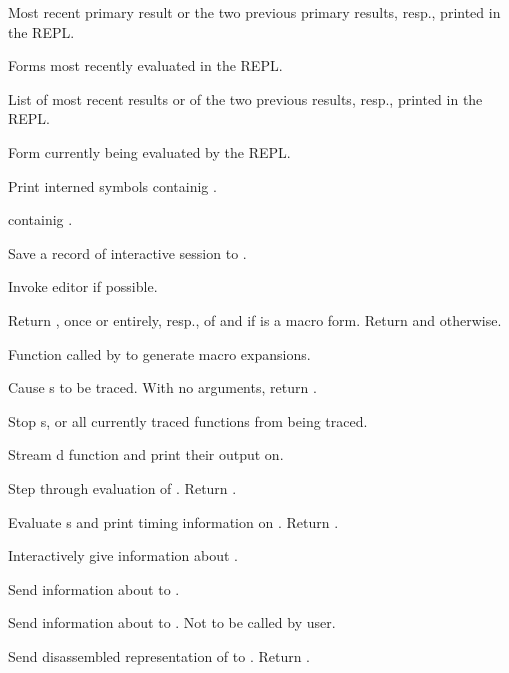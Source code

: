 \begin{LIST}{1cm}
  
  \IT{\Goo{\kwd*{*}\XOR\kwd*{**}\XOR\V*{***}}}
  Most recent primary result or the two previous primary results,
  resp., printed in the REPL. 
  
  \IT{\Goo{\kwd*{+}\XOR\kwd*{++}\XOR\V*{+++}}}
  Forms most recently evaluated in the REPL.
  
  \IT{\Goo{\kwd*{/}\XOR\kwd*{//}\XOR\V*{///}}}
  List of most recent results or of the two previous results, resp.,
  printed in the REPL. 
  
  \IT{\kwd*{--}}
  Form currently being evaluated by the REPL.

  Print interned symbols containig .

   containig .

  Save a record of interactive session to .

  Invoke editor if possible.

  Return , once or entirely, resp., of
   and \retvalii{\T} if  is a macro form. 
  Return  and \retval{\NIL} otherwise.

  Function called by  to generate macro expansions.

  Cause s to be traced. With no arguments,
  return .

  Stop s, or all currently traced functions from being
  traced. 

  Stream d function and  print their output on.
  
  Step through evaluation of . Return . 

  Evaluate s and print timing information on
  . Return . 
  
  Interactively give information about .

  Send information about  to .

  Send information about  to . Not to be
  called by user.

  Send disassembled representation of  to
  . Return \retval{\NIL}.

\end{LIST}


